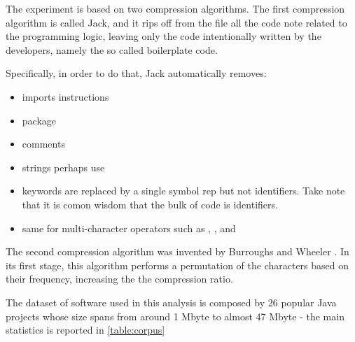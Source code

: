 
The experiment is based on two compression algorithms.
The first compression algorithm is called Jack, and it rips off from the file all the code note related to the programming logic, leaving
only the code intentionally written by the developers, namely the so called boilerplate code.

Specifically, in order to do that, Jack automatically removes:

\begin{itemize}
\item imports instructions
\item package
\item comments
\item strings perhaps use
\item keywords are replaced by a single symbol rep
but not identifiers. Take note that it is comon wisdom that the bulk of code is identifiers.
\item same for multi-character operators such as \cc{->}, \cc{[]}, and \cc{<<<<=}
\end{itemize}

The second compression algorithm was invented by Burroughs and Wheeler \cite{Burrows:Wheeler:1994}.
In its first stage, this algorithm performs a permutation of the characters based on their frequency, increasing the 
the compression ratio.  

The dataset of software used in this analysis is composed by 26 popular Java
projects whose size spans from around 1 Mbyte to almost 47 Mbyte - the main
statistics is reported in \cref{table:corpus}

\begin{table}
  \label{table:corpus}
  \caption{The results of the compression using the Burroughs-Wheeler algorithm}
  \centering
\end{table}
